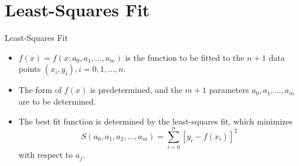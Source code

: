 \documentclass{beamer}
\begin{document}
\section[Least-Squares Fit]{Least-Squares Fit}
\begin{frame}{Least-Squares Fit}
\begin{itemize}
\item  $f(x)=f(x;a_0,a_1,\ldots,a_m)$ is the function to be fitted to the $n+1$ data points $(x_i,y_i),i=0,1,\ldots,n$.
\item The form of $f(x)$ is predetermined, and the  $m+1$ parameters $a_0, a_1, \ldots, a_m$ are to be determined.
\item The best fit function is determined by the \alert{least-squares} fit, which minimizes
\[
S(a_0, a_1, a_2, \ldots, a_m) =\sum_{i=0}^n[y_i-f(x_i)]^2
\]
with respect to $a_j$. 
\end{itemize}
\end{frame}
\end{document}
